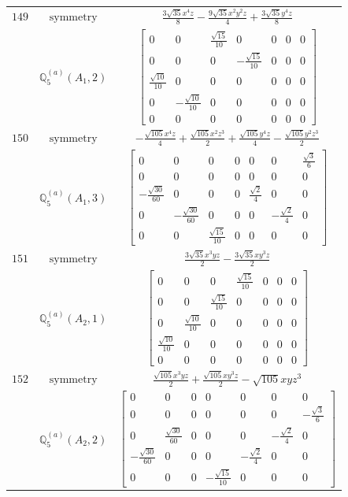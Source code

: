 \documentclass[fleqn,8pt,landscape]{jsarticle}
\begin{document}
\begin{longtable}{ccc}
$ 149 $ & $ \text{symmetry} $ & $ \frac{3 \sqrt{35} x^{4} z}{8} - \frac{9 \sqrt{35} x^{2} y^{2} z}{4} + \frac{3 \sqrt{35} y^{4} z}{8} $ \\
$  $ & $ \mathbb{Q}_{5}^{(a)}(A_{1},2) $ & $ \begin{bmatrix} 0 & 0 & \frac{\sqrt{15}}{10} & 0 & 0 & 0 & 0 \\ 0 & 0 & 0 & - \frac{\sqrt{15}}{10} & 0 & 0 & 0 \\ \frac{\sqrt{10}}{10} & 0 & 0 & 0 & 0 & 0 & 0 \\ 0 & - \frac{\sqrt{10}}{10} & 0 & 0 & 0 & 0 & 0 \\ 0 & 0 & 0 & 0 & 0 & 0 & 0 \end{bmatrix} $ \\ \hline
$ 150 $ & $ \text{symmetry} $ & $ - \frac{\sqrt{105} x^{4} z}{4} + \frac{\sqrt{105} x^{2} z^{3}}{2} + \frac{\sqrt{105} y^{4} z}{4} - \frac{\sqrt{105} y^{2} z^{3}}{2} $ \\
$  $ & $ \mathbb{Q}_{5}^{(a)}(A_{1},3) $ & $ \begin{bmatrix} 0 & 0 & 0 & 0 & 0 & 0 & \frac{\sqrt{3}}{6} \\ 0 & 0 & 0 & 0 & 0 & 0 & 0 \\ - \frac{\sqrt{30}}{60} & 0 & 0 & 0 & \frac{\sqrt{2}}{4} & 0 & 0 \\ 0 & - \frac{\sqrt{30}}{60} & 0 & 0 & 0 & - \frac{\sqrt{2}}{4} & 0 \\ 0 & 0 & \frac{\sqrt{15}}{10} & 0 & 0 & 0 & 0 \end{bmatrix} $ \\ \hline
$ 151 $ & $ \text{symmetry} $ & $ \frac{3 \sqrt{35} x^{3} y z}{2} - \frac{3 \sqrt{35} x y^{3} z}{2} $ \\
$  $ & $ \mathbb{Q}_{5}^{(a)}(A_{2},1) $ & $ \begin{bmatrix} 0 & 0 & 0 & \frac{\sqrt{15}}{10} & 0 & 0 & 0 \\ 0 & 0 & \frac{\sqrt{15}}{10} & 0 & 0 & 0 & 0 \\ 0 & \frac{\sqrt{10}}{10} & 0 & 0 & 0 & 0 & 0 \\ \frac{\sqrt{10}}{10} & 0 & 0 & 0 & 0 & 0 & 0 \\ 0 & 0 & 0 & 0 & 0 & 0 & 0 \end{bmatrix} $ \\ \hline
$ 152 $ & $ \text{symmetry} $ & $ \frac{\sqrt{105} x^{3} y z}{2} + \frac{\sqrt{105} x y^{3} z}{2} - \sqrt{105} x y z^{3} $ \\
$  $ & $ \mathbb{Q}_{5}^{(a)}(A_{2},2) $ & $ \begin{bmatrix} 0 & 0 & 0 & 0 & 0 & 0 & 0 \\ 0 & 0 & 0 & 0 & 0 & 0 & - \frac{\sqrt{3}}{6} \\ 0 & \frac{\sqrt{30}}{60} & 0 & 0 & 0 & - \frac{\sqrt{2}}{4} & 0 \\ - \frac{\sqrt{30}}{60} & 0 & 0 & 0 & - \frac{\sqrt{2}}{4} & 0 & 0 \\ 0 & 0 & 0 & - \frac{\sqrt{15}}{10} & 0 & 0 & 0 \end{bmatrix} $ \\ \hline

\end{longtable}
\end{document}
